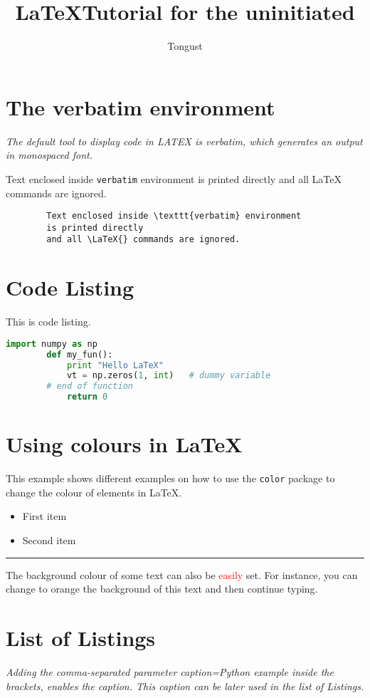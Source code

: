 \documentclass[a4paper, 12pt]{article}
\title{\LaTeX Tutorial for the uninitiated}
\author{Tongust}
\begin{document}
    \maketitle
	\tableofcontents
    \section{The verbatim environment}

	\emph{The default tool to display code in LATEX is verbatim, which generates an output in monospaced font.}

	Text enclosed inside \texttt{verbatim} environment 
	is printed directly 
	and all \LaTeX{} commands are ignored.	
   \begin{verbatim}
		Text enclosed inside \texttt{verbatim} environment 
		is printed directly 
		and all \LaTeX{} commands are ignored.
	\end{verbatim} 
    \section{Code Listing}

	This is code listing.

	\begin{lstlisting}[language=Python, caption=Python example]
		import numpy as np
		def my_fun():
			print "Hello LaTeX"
			vt = np.zeros(1, int)	# dummy variable
		# end of function
			return 0
	\end{lstlisting}
    \section{Using colours in \LaTeX}

	This example shows different examples on how to use the \texttt{color} package 
	to change the colour of elements in \LaTeX.
 
	\begin{itemize}
	\color{ForestGreen}
	\item First item
	\item Second item
	\end{itemize}
	 
	\noindent
	{\color{RubineRed} \rule{\linewidth}{0.5mm} }
	 
	The background colour of some text can also be \textcolor{red}{easily} set. For 
	instance, you can change to orange the background of \colorbox{BurntOrange}{this 
	text} and then continue typing.




	\section*{List of Listings}

	\emph{Adding the comma-separated parameter caption=Python example inside the brackets, enables the caption. This caption can be later used in the list of Listings.}

	\lstlistoflistings
\end{document}
